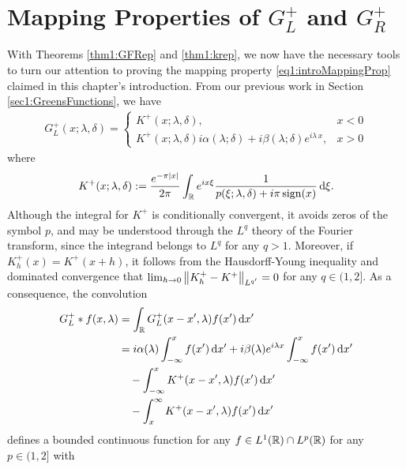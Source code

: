 \documentclass[../dissertation.tex]{subfiles}
\begin{document}
\section{Mapping Properties of $G_L^+$ and $G_R^+$}\label{sec1:MappingProps}

With Theorems \ref{thm1:GFRep} and \ref{thm1:krep}, we now have the necessary
tools to turn our attention to proving the mapping property \eqref{eq1:introMappingProp}
claimed in this chapter's introduction. From our previous work in Section 
\ref{sec1:GreensFunctions}, we have
\begin{align}
	G_L^+(x; \lambda, \delta) 
		= 
			\begin{cases}
				K^+(x; \lambda, \delta), & x < 0 \\
				K^+(x; \lambda, \delta)
				i \alpha(\lambda; \delta)  
					+ i \beta(\lambda; \delta) e^{i \lambda \, x}, 
					& x > 0
			\end{cases}
\end{align}
where 
\begin{align*}
	K^+(x; \lambda, \delta) 
			:= \frac{e^{-\pi |x|}}{2\pi} 
				\int_{\mathbb R} e^{i x \xi} 
					\frac{1}{p(\xi; \lambda, \delta) + i \pi \sign(x)}
				\, \mathrm{d}\xi.
\end{align*}
Although the integral for $K^+$ is conditionally convergent, it avoids zeros of the symbol 
$p$, and may be understood through the $L^q$ theory of the Fourier transform, since the 
integrand belongs to $L^q$ for any $q>1$.  Moreover, if $K_h^+(x) = K^+(x+h)$, it follows 
from the Hausdorff-Young inequality and dominated convergence that 
$\lim_{h \to 0} \norm[L^{q'}]{K_h^+ - K^+} =0$ for any $q \in (1,2]$. As a consequence,
the convolution
\begin{align}
	\label{ILW.GL*f}
	G_L^+ * f(x,\lambda) 	
		&=	\int_{\mathbb R} G_L^+(x-x',\lambda) f(x') \, \mathrm{d}x' 	\\
		&=	i \alpha (\lambda) \int_{-\infty}^x f(x') \, \mathrm{d}x' 
			+ i \beta(\lambda) e^{i\lam x} \int_{-\infty}^x f(x') \, \mathrm{d}x'
			\nonumber \\
		&\quad 	- \int_{-\infty}^x K^+(x-x',\lambda) f	(x') \, \mathrm{d}x' \nonumber\\
		&\quad	- \int_x^\infty K^+(x-x',\lambda) f(x') \, \mathrm{d}x'\nonumber
\end{align}
defines a bounded continuous function for any $f \in L^1(\RR) \cap L^p(\RR)$ for any $p \in (1,2]$ with
\end{document}
